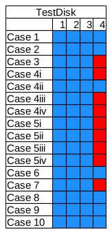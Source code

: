 \begin{figure}[h]
\begin{subfigure}{0.17\linewidth}
    \end{subfigure}~~
    \begin{subfigure}{0.17\linewidth}
        \includegraphics[width=\linewidth]{fig/testdisk_results_fat.png}

\end{subfigure}
\end{figure}
